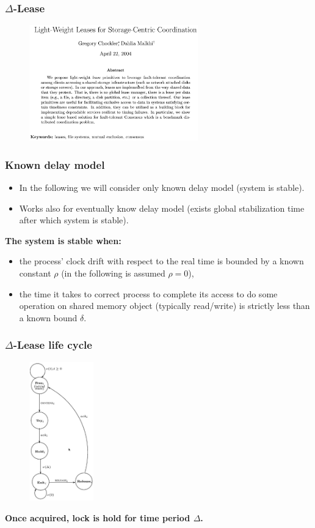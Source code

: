 \documentclass[10pt,utf8]{beamer}
\begin{document}
\begin{frame}
    \frametitle{$\Delta$-Lease}
    \begin{figure}
        \centering
        \includegraphics[height=5cm]{./img/delta-leases-paper.eps}
    \end{figure}
\end{frame}

\begin{frame}
    \frametitle{Known delay model}
    \begin{itemize}
     \item In the following we will consider only known delay model (system is stable).
     \item Works also for eventually know delay model (exists global stabilization time after which system is stable).
    \end{itemize}
    
    \vspace{1cm}
    
    \centering
    \textbf{The system is stable when:}
    \begin{itemize}
     \item the process' clock drift with respect to the real time is bounded by a known constant $\rho$ (in the following is assumed $\rho=0$),
     \item the time it takes to correct process to complete its access to do some operation on shared memory object (typically read/write) is strictly less than a known bound $\delta$.
    \end{itemize}
\end{frame}

\begin{frame}
    \frametitle{$\Delta$-Lease life cycle}
    \begin{figure}
        \centering
        \includegraphics[height=6cm]{./img/delta-lease-life-cycle.eps}
    \end{figure}
    
    \centering
    \textbf{Once acquired, lock is hold for time period $\Delta$.}
\end{frame}
\end{document}
